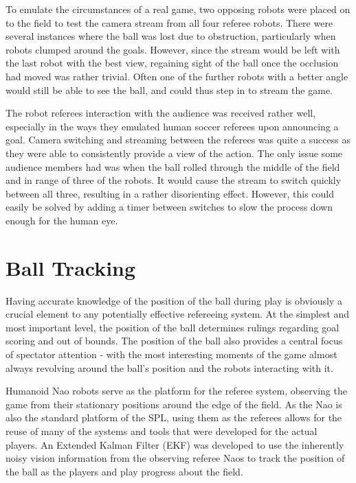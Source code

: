 \documentclass[runningheads,a4paper]{llncs}
\begin{document}
To emulate the circumstances of a real game, two opposing robots were placed on to the field to test the camera stream from all four referee robots.
There were several instances where the ball was lost due to obstruction, particularly when robots clumped around the goals.
However, since the stream would be left with the last robot with the best view, regaining sight of the ball once the occlusion had moved was rather trivial.
Often one of the further robots with a better angle would still be able to see the ball, and could thus step in to stream the game.

The robot referees interaction with the audience was received rather well, especially in the ways they emulated human soccer referees upon announcing a goal.
Camera switching and streaming between the referees was quite a success as they were able to consistently provide a view of the action.
The only issue some audience members had was when the ball rolled through the middle of the field and in range of three of the robots.
It would cause the stream to switch quickly between all three, resulting in a rather disorienting effect.
However, this could easily be solved by adding a timer between switches to slow the process down enough for the human eye.


\section{Ball Tracking}
Having accurate knowledge of the position of the ball during play is obviously a crucial element to any potentially effective refereeing system. At the simplest and most important level, the position of the ball determines rulings regarding goal scoring and out of bounds. The position of the ball also provides a central focus of spectator attention - with the most interesting moments of the game almost always revolving around the ball's position and the robots interacting with it.

Humanoid Nao robots serve as the platform for the referee system, observing the game from their stationary positions around the edge of the field. As the Nao is also the standard platform of the SPL, using them as the referees allows for the reuse of many of the systems and tools that were developed for the actual players. An Extended Kalman Filter (EKF)\cite{kalmanintro} was developed to use the inherently noisy vision information from the observing referee Naos to track the position of the ball as the players and play progress about the field.
\end{document}
